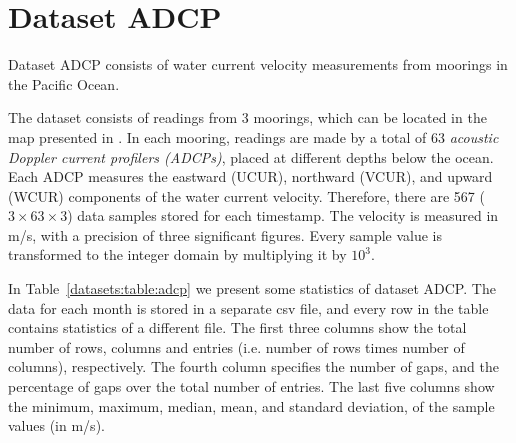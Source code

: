 
\vspace{-10pt}
\section{Dataset ADCP}
\label{datasets:adcp}


Dataset ADCP \cite{dataset:sst1} consists of water current velocity measurements from moorings in the Pacific Ocean. \TAODef


The dataset consists of readings from 3 moorings, which can be located in the map presented in \cite{dataset:sst1}. In each mooring, readings are made by a total of 63 \textit{acoustic Doppler current profilers (ADCPs)}, placed at different depths below the ocean. Each ADCP measures the eastward (UCUR), northward (VCUR), and upward (WCUR) components of the water current velocity. Therefore, there are 567 ($3\times63\times3$) data samples stored for each timestamp. The velocity is measured in m/s, with a precision of three significant figures. Every sample value is transformed to the integer domain by multiplying it by $10^3$.


In Table~\ref{datasets:table:adcp} we present some statistics of dataset ADCP. The data for each month is stored in a separate csv file, and every row in the table contains statistics of a different file. The first three columns show the total number of rows, columns and entries (i.e. number of rows times number of columns), respectively. The fourth column specifies the number of gaps, and the percentage of gaps over the total number of entries. The last five columns show the minimum, maximum, median, mean, and standard deviation, of the sample values (in m/s).




